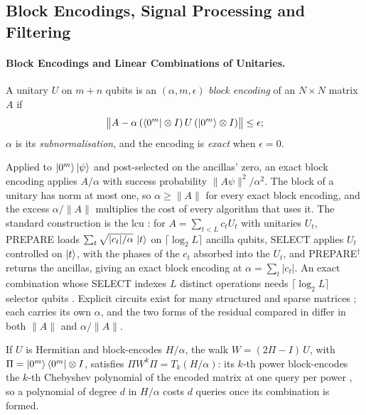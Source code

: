 \subsection{Block Encodings, Signal Processing and Filtering}
\label{sec:bg-primitives}

\paragraph{Block Encodings and Linear Combinations of Unitaries.}
\label{sec:bg-block-encoding}

\begin{definition}
\label{def:block-encoding}
A unitary $U$ on $m+n$ qubits is an $(\alpha,m,\epsilon)$ \emph{block encoding} of an $N\times N$ matrix $A$ if
\begin{equation}
    \bigl\|A-\alpha\,(\bra{0^m}\otimes I)\,U\,(\ket{0^m}\otimes I)\bigr\|\le\epsilon ;
    \label{eq:block-encoding}
\end{equation}
$\alpha$ is its \emph{subnormalisation}, and the encoding is \emph{exact} when $\epsilon=0$.
\end{definition}

Applied to $\ket{0^m}\ket{\psi}$ and post-selected on the ancillas' zero, an exact block encoding applies $A/\alpha$ with success probability $\|A\psi\|^2/\alpha^2$. The block of a unitary has norm at most one, so $\alpha\ge\|A\|$ for every exact block encoding, and the excess $\alpha/\|A\|$ multiplies the cost of every algorithm that uses it. The standard construction is the \gls{lcu} \cite{childs2012lcu}: for $A=\sum_{t<L}c_tU_t$ with unitaries $U_t$, PREPARE loads $\sum_t\sqrt{|c_t|/\alpha}\,\ket{t}$ on $\lceil\log_2L\rceil$ ancilla qubits, SELECT applies $U_t$ controlled on $\ket{t}$, with the phases of the $c_t$ absorbed into the $U_t$, and PREPARE$^\dagger$ returns the ancillas, giving an exact block encoding at $\alpha=\sum_t|c_t|$. An exact combination whose SELECT indexes $L$ distinct operations needs $\lceil\log_2L\rceil$ selector qubits \cite{chakraborty2025qsvt}. Explicit circuits exist for many structured and sparse matrices \cite{camps2024explicit,sunderhauf2024blockencoding}; each carries its own $\alpha$, and the two forms of the residual compared in  differ in both $\|A\|$ and $\alpha/\|A\|$.

If $U$ is Hermitian and block-encodes $H/\alpha$, the walk $W=(2\Pi-I)\,U$, with $\Pi=\ket{0^m}\bra{0^m}\otimes I$, satisfies $\Pi W^k\Pi=T_k(H/\alpha)$: its $k$-th power block-encodes the $k$-th Chebyshev polynomial of the encoded matrix at one query per power \cite{lowchuang2019qubitization}, so a polynomial of degree $d$ in $H/\alpha$ costs $d$ queries once its combination is formed.

